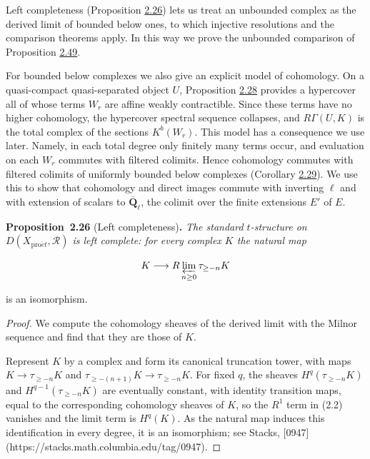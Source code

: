 \documentclass[11pt]{article}
\newenvironment{bpstatement}[2]{\par\addvspace{0.6\baselineskip}\noindent\textbf{#1}#2\textbf{.}\enspace\ignorespaces}
  {\par\addvspace{0.4\baselineskip}}
\newenvironment{bpstatementit}[2]{\begin{bpstatement}{#1}{#2}\itshape\ignorespaces}{\end{bpstatement}}
\begin{document}
Left completeness (Proposition \hyperref[bp77]{2.26}) lets us treat an unbounded complex as the derived limit of bounded below ones, to which injective resolutions and the comparison theorems apply. In this way we prove the unbounded comparison of Proposition \hyperref[bp146]{2.49}.

For bounded below complexes we also give an explicit model of cohomology. On a quasi-compact quasi-separated object \(U\), Proposition \hyperref[bp83]{2.28} provides a hypercover all of whose terms \(W_r\) are affine weakly contractible. Since these terms have no higher cohomology, the hypercover spectral sequence collapses, and \(R\Gamma(U,K)\) is the total complex of the sections \(K^b(W_r)\). This model has a consequence we use later. Namely, in each total degree only finitely many terms occur, and evaluation on each \(W_r\) commutes with filtered colimits. Hence cohomology commutes with filtered colimits of uniformly bounded below complexes (Corollary \hyperref[bp86]{2.29}). We use this to show that cohomology and direct images commute with inverting \(\ell\) and with extension of scalars to \(\overline{\mathbf Q}_\ell\), the colimit over the finite extensions \(E'\) of \(E\).

\label{bp77}%
\begin{bpstatementit}{Proposition~2.26}{ (Left completeness)}
The standard \(t\)-structure on \(D(X_{\mathrm{pro}\acute{e}t},\mathcal R)\) is left complete: for every complex \(K\) the natural map

\[
K\longrightarrow R\varprojlim_{n\geq0}\tau_{\geq-n}K
\]

is an isomorphism.
\end{bpstatementit}

\begin{proof}[{Proof}]\label{bp78}%
We compute the cohomology sheaves of the derived limit with the Milnor sequence and find that they are those of \(K\).

Represent \(K\) by a complex and form its canonical truncation tower, with maps \(K\to\tau_{\geq-n}K\) and \(\tau_{\geq-(n+1)}K\to\tau_{\geq-n}K\). For fixed \(q\), the sheaves \(H^q(\tau_{\geq-n}K)\) and \(H^{q-1}(\tau_{\geq-n}K)\) are eventually constant, with identity transition maps, equal to the corresponding cohomology sheaves of \(K\), so the \(R^1\) term in (2.2) vanishes and the limit term is \(H^q(K)\). As the natural map induces this identification in every degree, it is an isomorphism; see Stacks, [0947](https://stacks.math.columbia.edu/tag/0947).
\end{proof}
\end{document}
